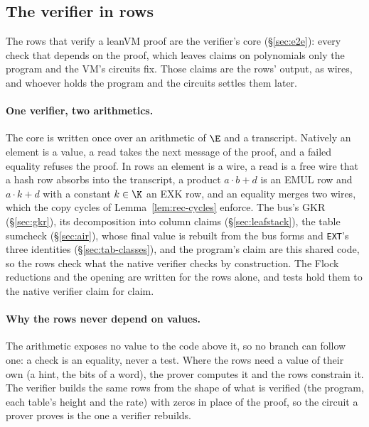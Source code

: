 \subsection{The verifier in rows}\label{rec:verifier}

The rows that verify a leanVM proof are the verifier's core (\S\ref{sec:e2e}): every check that depends on the proof, which leaves claims on polynomials only the program and the VM's circuits fix. Those claims are the rows' output, as wires, and whoever holds the program and the circuits settles them later.

\paragraph{One verifier, two arithmetics.} The core is written once over an arithmetic of $\E$ and a transcript. Natively an element is a value, a read takes the next message of the proof, and a failed equality refuses the proof. In rows an element is a wire, a read is a free wire that a hash row absorbs into the transcript, a product $a\cdot b+d$ is an \textsf{EMUL} row and $a\cdot k+d$ with a constant $k\in\K$ an \textsf{EXK} row, and an equality merges two wires, which the copy cycles of Lemma~\ref{lem:rec-cycles} enforce. The bus's GKR (\S\ref{sec:gkr}), its decomposition into column claims (\S\ref{sec:leafstack}), the table sumcheck (\S\ref{sec:air}), whose final value is rebuilt from the bus forms and \texttt{EXT}'s three identities (\S\ref{sec:tab-classes}), and the program's claim are this shared code, so the rows check what the native verifier checks by construction. The Flock reductions and the opening are written for the rows alone, and tests hold them to the native verifier claim for claim.

\paragraph{Why the rows never depend on values.} The arithmetic exposes no value to the code above it, so no branch can follow one: a check is an equality, never a test. Where the rows need a value of their own (a hint, the bits of a word), the prover computes it and the rows constrain it. The verifier builds the same rows from the shape of what is verified (the program, each table's height and the rate) with zeros in place of the proof, so the circuit a prover proves is the one a verifier rebuilds.

